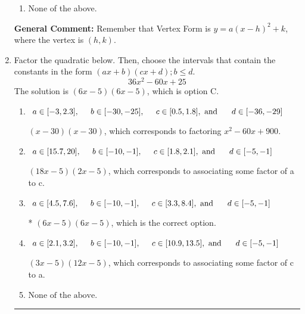 \documentclass{extbook}[14pt]
\newcommand{\litem}[1]{\item #1

\rule{\textwidth}{0.4pt}}
\begin{document}
\begin{enumerate}
{\begin{enumerate}[label=\Alph*.]
\item None of the above.\end{enumerate}
\textbf{General Comment:} Remember that Vertex Form is $y = a(x-h)^2+k$, where the vertex is $(h, k)$.
}
\litem{
Factor the quadratic below. Then, choose the intervals that contain the constants in the form $(ax+b)(cx+d); b \leq d.$
\[ 36x^{2} -60 x + 25 \]
The solution is \( (6x -5)(6x -5) \), which is option C.\begin{enumerate}[label=\Alph*.]
\item \( a \in [-3, 2.3], \hspace*{5mm} b \in [-30, -25], \hspace*{5mm} c \in [0.5, 1.8], \text{ and } \hspace*{5mm} d \in [-36, -29] \)

 $(x -30)(x -30)$, which corresponds to factoring $x^{2} -60 x + 900$.
\item \( a \in [15.7, 20], \hspace*{5mm} b \in [-10, -1], \hspace*{5mm} c \in [1.8, 2.1], \text{ and } \hspace*{5mm} d \in [-5, -1] \)

 $(18x -5)(2x -5)$, which corresponds to associating some factor of a to c.
\item \( a \in [4.5, 7.6], \hspace*{5mm} b \in [-10, -1], \hspace*{5mm} c \in [3.3, 8.4], \text{ and } \hspace*{5mm} d \in [-5, -1] \)

* $(6x -5)(6x -5)$, which is the correct option.
\item \( a \in [2.1, 3.2], \hspace*{5mm} b \in [-10, -1], \hspace*{5mm} c \in [10.9, 13.5], \text{ and } \hspace*{5mm} d \in [-5, -1] \)

 $(3x -5)(12x -5)$, which corresponds to associating some factor of c to a.
\item \( \text{None of the above.} \)


\end{enumerate}}
\end{enumerate}
\end{document}
